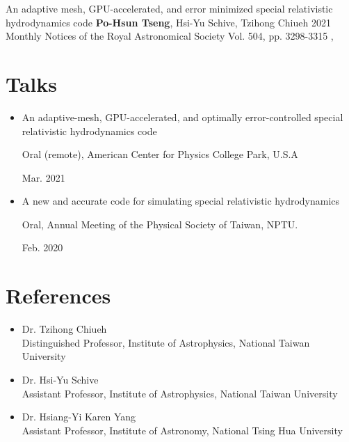\documentclass[%
               doublesided,
               paper=a4,
               fontsize=10pt
              ]{resume}
\begin{document}
\publication
	{An adaptive mesh, GPU-accelerated,
         and error minimized special relativistic hydrodynamics code} %
	{\textbf{Po-Hsun Tseng}, Hsi-Yu Schive, Tzihong Chiueh} %
	{2021} %
	{Monthly Notices of the Royal Astronomical Society Vol. 504, pp. 3298-3315} %
	{,
         } %


\section{Talks}
\begin{itemize}
\item
          An adaptive-mesh, GPU-accelerated, and optimally error-controlled
          special relativistic hydrodynamics code\\
          \begin{minipage}{6in}
       	  Oral (remote), American Center for Physics College Park, U.S.A
          \end{minipage}
          \hfill
          \begin{minipage}{1in}
          Mar. 2021
          \end{minipage}
\item
          A new and accurate code for simulating special relativistic hydrodynamics\\
          \begin{minipage}{6in}
          Oral, Annual Meeting of the Physical Society of Taiwan, NPTU.
          \end{minipage}
          \hfill
          \begin{minipage}{1in}
          Feb. 2020
          \end{minipage}
\end{itemize}
\section{References}
\begin{itemize}
  \item Dr. Tzihong Chiueh\\
        Distinguished Professor, Institute of Astrophysics, National Taiwan University\\
  \item Dr. Hsi-Yu Schive\\
        Assistant Professor, Institute of Astrophysics, National Taiwan University\\
  \item Dr. Hsiang-Yi Karen Yang\\
        Assistant Professor, Institute of Astronomy, National Tsing Hua University\\
\end{itemize}
\end{document}
